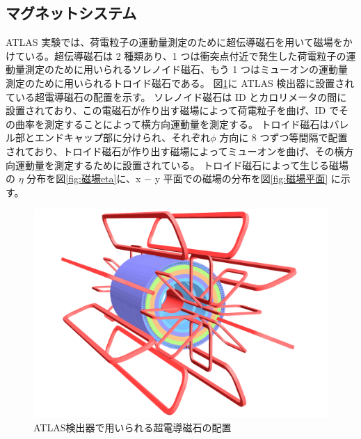 \subsection{マグネットシステム}\label{magnetic_filed}
ATLAS 実験では、荷電粒子の運動量測定のために超伝導磁石を用いて磁場をかけている。超伝導磁石は 2 種類あり、1 つは衝突点付近で発生した荷電粒子の運動量測定のために用いられるソレノイド磁石、もう 1 つはミューオンの運動量測定のために用いられるトロイド磁石である。
図\ref{fig:磁石}に ATLAS 検出器に設置されている超電導磁石の配置を示す。
ソレノイド磁石は ID とカロリメータの間に設置されており、この電磁石が作り出す磁場によって荷電粒子を曲げ、ID でその曲率を測定することによって横方向運動量を測定する。
トロイド磁石はバレル部とエンドキャップ部に分けられ、それぞれ$\phi$ 方向に 8 つずつ等間隔で配置されており、トロイド磁石が作り出す磁場によってミューオンを曲げ、その横方向運動量を測定するために設置されている。
トロイド磁石によって生じる磁場の $\eta$ 分布を図\ref{fig:磁場eta}に、x − y 平面での磁場の分布を図\ref{fig:磁場平面} に示す。

\begin{figure}[tb]
  \centering
  \includegraphics[clip, width=14cm]{fig/2/ATLcoilGeom.pdf}
  \caption{ATLAS検出器で用いられる超電導磁石の配置}
  \label{fig:磁石}
\end{figure}

